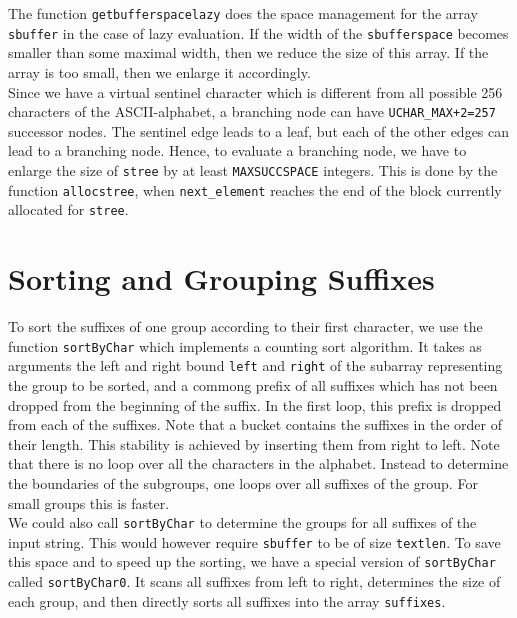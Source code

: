 \documentclass[a4paper]{article}
\begin{document}
The function \texttt{getbufferspacelazy} does the space management for the
array \texttt{sbuffer} in the case of lazy evaluation. If the width of the
\texttt{sbufferspace} becomes smaller than some maximal width, then we reduce
the size of this array. If the array is too small, then we enlarge it
accordingly.\\


Since we have a virtual sentinel character which is different from all possible
256 characters of the ASCII-alphabet, a branching node can have
\texttt{UCHAR\_MAX+2=257} successor nodes. The sentinel edge leads to a leaf,
but each of the other edges can lead to a branching node. Hence, to evaluate a
branching node, we have to enlarge the size of \texttt{stree} by at least
\texttt{MAXSUCCSPACE} integers. This is done by the function
\texttt{allocstree}, when \texttt{next_element} reaches the end of the
block currently allocated for \texttt{stree}.


\section{Sorting and Grouping Suffixes}

To sort the suffixes of one group according to their first character,
we use the function \texttt{sortByChar} which implements a counting sort
algorithm. It takes as arguments the left and right bound \texttt{left} and
\texttt{right} of the subarray representing the group to be sorted, and
a commong prefix of all suffixes which has not been dropped from the
beginning of the suffix. In the first loop, this prefix is dropped
from each of the suffixes. Note that a bucket contains the suffixes
in the order of their length. This stability is achieved by inserting
them from right to left. Note that there is no loop over all the
characters in the alphabet. Instead to determine the boundaries
of the subgroups, one loops over all suffixes of the group. For small
groups this is faster.\\


We could also call \texttt{sortByChar} to determine the groups for all suffixes
of the input string. This would however require \texttt{sbuffer} to be of size
\texttt{textlen}. To save this space and to speed up the sorting, we have a
special version of \texttt{sortByChar} called \texttt{sortByChar0}. It scans
all suffixes from left to right, determines the size of each group, and then
directly sorts all suffixes into the array \texttt{suffixes}.\\
\end{document}
